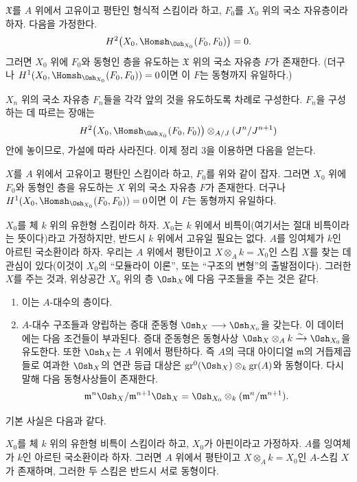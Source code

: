  $\mathfrak X$를 $A$ 위에서 고유이고 평탄인 형식적
스킴이라 하고, $F_0$를 $X_0$ 위의 국소 자유층이라 하자. 다음을 가정한다.
\[
  H^2\bigl(X_0,\Homsh_{\Osh_{X_0}}(F_0,F_0)\bigr)=0.
\]
그러면 $X_0$ 위에 $F_0$와 동형인 층을 유도하는 $\mathfrak X$ 위의 국소
자유층 $F$가 존재한다. (더구나
$H^1(X_0,\Homsh_{\Osh_{X_0}}(F_0,F_0))=0$이면 이 $F$는 동형까지
유일하다.)

$X_n$ 위의 국소 자유층 $F_n$들을 각각 앞의 것을 유도하도록 차례로
구성한다. $F_n$을 구성하는 데 따르는 장애는
\[
  H^2\bigl(X_0,\Homsh_{\Osh_{X_0}}(F_0,F_0)\bigr)
  \otimes_{A/J}(J^n/J^{n+1})
\]
안에 놓이므로, 가설에 따라 사라진다. 이제 정리 3을 이용하면 다음을 얻는다.

 $X$를 $A$ 위에서 고유이고 평탄인 스킴이라 하고,
$F_0$를 위와 같이 잡자. 그러면 $X_0$ 위에 $F_0$와 동형인 층을 유도하는
$X$ 위의 국소 자유층 $F$가 존재한다. 더구나
$H^1(X_0,\Homsh_{\Osh_{X_0}}(F_0,F_0))=0$이면 이 $F$는 동형까지
유일하다.

$X_0$를 체 $k$ 위의 유한형 스킴이라 하자. $X_0$는 $k$ 위에서
비특이(여기서는 절대 비특이라는 뜻이다)라고 가정하지만, 반드시 $k$ 위에서
고유일 필요는 없다. $A$를 잉여체가 $k$인 아르틴 국소환이라 하자. 우리는
$A$ 위에서 평탄이고
$X\otimes_A k=X_0$인 스킴 $X$를 찾는 데 관심이 있다(이것이 $X_0$의
``모듈라이 이론'', 또는 ``구조의 변형''의 출발점이다). 그러한 $X$를 주는
것과, 위상공간 $X_0$ 위의 층 $\Osh_X$에 다음 구조들을 주는 것은 같다.
\begin{enumerate}
  \item[\textit{i.}] 이는 $A$-대수의 층이다.
  \item[\textit{ii.}] $A$-대수 구조들과 양립하는 증대 준동형
    $\Osh_X\longrightarrow\Osh_{X_0}$을 갖는다. 이 데이터에는 다음 조건들이
    부과된다. 증대 준동형은 동형사상
    $\Osh_X\otimes_A k\xrightarrow{\sim}\Osh_{X_0}$을 유도한다. 또한
    $\Osh_X$는 $A$ 위에서 평탄하다. 즉 $A$의 극대 아이디얼
    $\mathfrak m$의 거듭제곱들로 여과한 $\Osh_X$의 연관 등급 대상은
    $\operatorname{gr}^0(\Osh_X)\otimes_k\operatorname{gr}(A)$와 동형이다.
    다시 말해 다음 동형사상들이 존재한다.
    \[
      \mathfrak m^n\Osh_X/\mathfrak m^{n+1}\Osh_X
      =\Osh_{X_0}\otimes_k(\mathfrak m^n/\mathfrak m^{n+1}).
    \]
\end{enumerate}
기본 사실은 다음과 같다.

 $X_0$를 체 $k$ 위의 유한형 비특이 스킴이라 하고,
$X_0$가 아핀이라고 가정하자. $A$를 잉여체가 $k$인 아르틴 국소환이라
하자. 그러면 $A$ 위에서 평탄이고 $X\otimes_A k=X_0$인 $A$-스킴 $X$가
존재하며, 그러한 두 스킴은 반드시 서로 동형이다.


